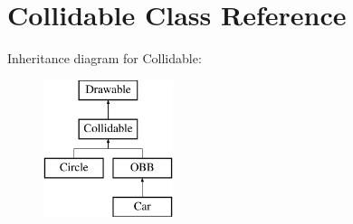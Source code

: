 \hypertarget{class_collidable}{}\section{Collidable Class Reference}
\label{class_collidable}
Inheritance diagram for Collidable\+:\begin{figure}[H]
\begin{center}
\leavevmode
\includegraphics[height=4.000000cm]{class_collidable}
\end{center}
\end{figure}
